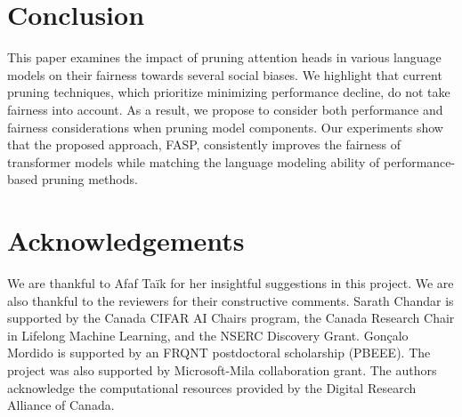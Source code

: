 \documentclass[letterpaper]{article} %
\begin{document}
\section{Conclusion}
This paper examines the impact of pruning attention heads in various language models on their fairness towards several social biases. %
We highlight that current pruning techniques, which prioritize minimizing performance decline, do not take fairness into account. As a result, we propose to consider both performance and fairness considerations when pruning model components. Our experiments show that the proposed approach, FASP, consistently improves the fairness of transformer models while matching the language modeling ability of performance-based pruning methods.%

\section*{Acknowledgements}

We are thankful to Afaf Taïk for her insightful suggestions in this project. We are also thankful to the reviewers for their constructive comments. Sarath Chandar is supported by the Canada CIFAR AI Chairs program, the Canada Research Chair in Lifelong Machine Learning, and the NSERC Discovery Grant. Gonçalo Mordido is supported by an FRQNT postdoctoral scholarship (PBEEE). The project was also supported by Microsoft-Mila collaboration grant. The authors acknowledge the computational resources provided by the Digital Research Alliance of Canada.





\end{document}
